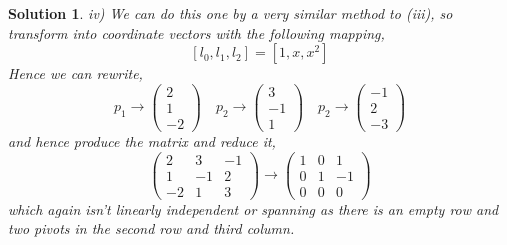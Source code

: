 \documentclass{article}
\newcommand{\thbth}[9]{\begin{pmatrix} #1 & #2 & #3 \\ #4 & #5 & #6 \\ #7 & #8 & #9\end{pmatrix}}
\newtheorem{solution}{Solution}
\begin{document}
\begin{solution}
  \noindent
  iv) We can do this one by a very similar method to (iii), so transform into coordinate vectors with the following mapping,
  $$ [l_0, l_1, l_2] = [1, x, x^2] $$
  Hence we can rewrite,
  $$ p_1 \to \begin{pmatrix}
    2 \\ 1 \\ -2
  \end{pmatrix} \quad p_2 \to \begin{pmatrix}
    3 \\ -1 \\ 1
  \end{pmatrix} \quad p_2 \to \begin{pmatrix}
    -1 \\ 2 \\ -3
  \end{pmatrix}$$
  and hence produce the matrix and reduce it,
  $$ \thbth 2 3 {-1} 1 {-1} 2 {-2} 1 3  \to \thbth 1 0 1 0 1 {-1} 0 0 0$$
  which again isn't linearly independent or spanning as there is an empty row and two pivots in the second row and third column.
\end{solution}
\end{document}
